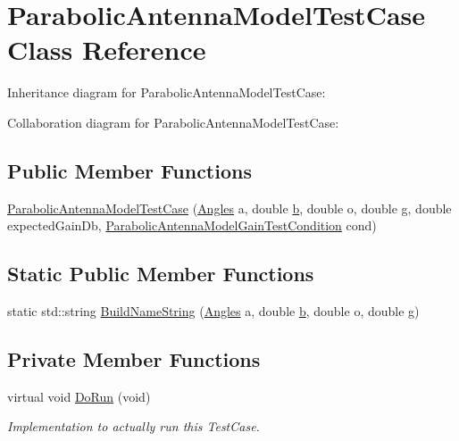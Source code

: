 \hypertarget{classParabolicAntennaModelTestCase}{}\section{Parabolic\+Antenna\+Model\+Test\+Case Class Reference}
\label{classParabolicAntennaModelTestCase}


Inheritance diagram for Parabolic\+Antenna\+Model\+Test\+Case\+:


Collaboration diagram for Parabolic\+Antenna\+Model\+Test\+Case\+:
\subsection*{Public Member Functions}
\begin{DoxyCompactItemize}
\item 
\hyperlink{classParabolicAntennaModelTestCase_aefcd886a32210ca6c1ea337d87d57260}{Parabolic\+Antenna\+Model\+Test\+Case} (\hyperlink{structns3_1_1Angles}{Angles} a, double \hyperlink{lte__pathloss_8m_a21ad0bd836b90d08f4cf640b4c298e7c}{b}, double o, double \hyperlink{loss__OH__suburban_8m_a6182af7c15da7a804d8d96b71bcd5ab7}{g}, double expected\+Gain\+Db, \hyperlink{test-parabolic-antenna_8cc_a893d085fdc93f5aae203e0153fb83d32}{Parabolic\+Antenna\+Model\+Gain\+Test\+Condition} cond)
\end{DoxyCompactItemize}
\subsection*{Static Public Member Functions}
\begin{DoxyCompactItemize}
\item 
static std\+::string \hyperlink{classParabolicAntennaModelTestCase_a0c288238ef007a85c5021ff60c594220}{Build\+Name\+String} (\hyperlink{structns3_1_1Angles}{Angles} a, double \hyperlink{lte__pathloss_8m_a21ad0bd836b90d08f4cf640b4c298e7c}{b}, double o, double \hyperlink{loss__OH__suburban_8m_a6182af7c15da7a804d8d96b71bcd5ab7}{g})
\end{DoxyCompactItemize}
\subsection*{Private Member Functions}
\begin{DoxyCompactItemize}
\item 
virtual void \hyperlink{classParabolicAntennaModelTestCase_aff4d840d72b8e53febb6ebbce2f19644}{Do\+Run} (void)
\begin{DoxyCompactList}\small\item\em Implementation to actually run this Test\+Case. \end{DoxyCompactList}\end{DoxyCompactItemize}
